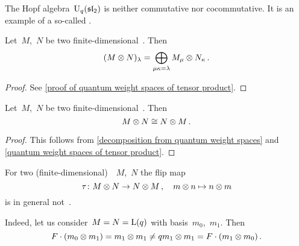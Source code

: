 \documentclass[a4paper, 11pt, oneside]{scrartcl}
\begin{document}
\begin{remark}
      The Hopf algebra~$\operatorname{U}_q(\mathfrak{sl}_2)$ is neither commutative nor cocommutative.
      It is an example of a so-called .
\end{remark}

\begin{lemma}
  \label{quantum weight spaces of tensor product}
  Let~$M$,~$N$ be two finite-dimensional~.
  Then
  \[
    (M \otimes N)_\lambda
    =
    \bigoplus_{\mu \kappa = \lambda}
    M_\mu \otimes N_\kappa \,.
  \]
\end{lemma}

\begin{proof}
  See \cref{proof of quantum weight spaces of tensor product}.
\end{proof}

\begin{corollary}
  Let~$M$,~$N$ be two finite-dimensional~.
  Then
  \[
    M \otimes N
    \cong
    N \otimes M \,.
  \]
\end{corollary}

\begin{proof}
  This follows from \cref{decomposition from quantum weight spaces} and \cref{quantum weight spaces of tensor product}.
\end{proof}

\begin{warning}
  For two (finite-dimensional)~~$M$,~$N$ the flip map
  \[
    \tau
    \colon
    M \otimes N
    \to
    N \otimes M \,,
    \quad
    m \otimes n
    \mapsto
    n \otimes m
  \]
  is in general not~.
\end{warning}

\begin{example}
  Indeed, let us consider~$M = N = \operatorname{L}(q)$ with basis~$m_0$,~$m_1$.
  Then
  \[
    F \cdot (m_0 \otimes m_1)
    =
    m_1 \otimes m_1
    \neq
    q m_1 \otimes m_1
    =
    F \cdot (m_1 \otimes m_0) \,.
  \]
\end{example}
\end{document}
